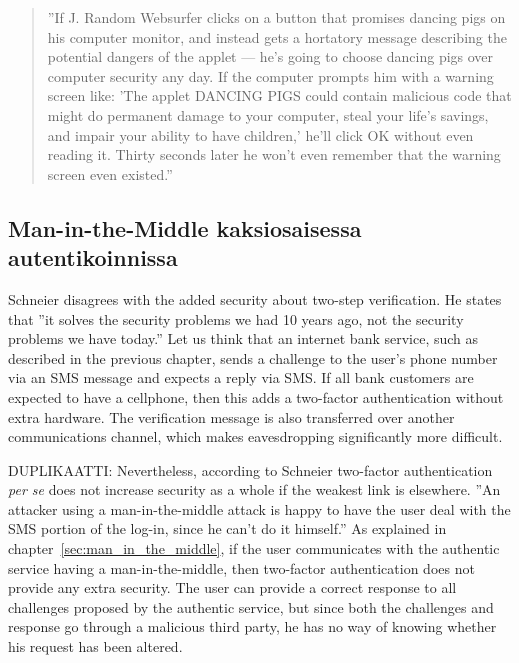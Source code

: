 \documentclass[english,gradu]{tktltiki}
\begin{document}
            \begin{quote}
              \label{quote:dancing_pigs}
              ''If J. Random Websurfer clicks on a button that promises dancing pigs on his computer monitor, and instead gets a hortatory message describing the potential dangers of the applet — he's going to choose dancing pigs over computer security any day. If the computer prompts him with a warning screen like: 'The applet DANCING PIGS could contain malicious code that might do permanent damage to your computer, steal your life's savings, and impair your ability to have children,' he'll click OK without even reading it. Thirty seconds later he won't even remember that the warning screen even existed.'' \cite{schneier_secrets_and_lies_2000}
            \end{quote}



\subsection{Man-in-the-Middle kaksiosaisessa autentikoinnissa}

            Schneier \cite{schneier_2factor_2005} disagrees with the added security about two-step verification. He states that ''it solves the security problems we had 10 years ago, not the security problems we have today.'' Let us think that an internet bank service, such as described in the previous chapter, sends a challenge to the user's phone number via an SMS message and expects a reply via SMS. If all bank customers are expected to have a cellphone, then this adds a two-factor authentication without extra hardware. The verification message is also transferred over another communications channel, which makes eavesdropping significantly more difficult.

             DUPLIKAATTI:
             Nevertheless, according to Schneier \cite{schneier_2factor_2005} two-factor authentication \emph{per se} does not increase security as a whole if the weakest link is elsewhere. ''An attacker using a man-in-the-middle attack is happy to have the user deal with the SMS portion of the log-in, since he can’t do it himself.'' \cite{schneier_2factor_2005} As explained in chapter~\ref{sec:man_in_the_middle}, if the user communicates with the authentic service having a man-in-the-middle, then two-factor authentication does not provide any extra security. The user can provide a correct response to all challenges proposed by the authentic service, but since both the challenges and response go through a malicious third party, he has no way of knowing whether his request has been altered.
\end{document}
